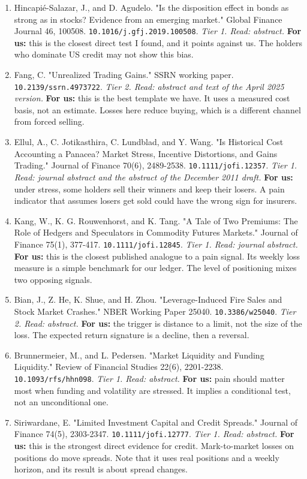 \begin{enumerate}[leftmargin=*,itemsep=3pt]
\item Hincapié-Salazar, J., and D. Agudelo. "Is the disposition effect in bonds as strong as in stocks? Evidence from an emerging market." Global Finance Journal 46, 100508. \nolinkurl{10.1016/j.gfj.2019.100508}. \emph{Tier 1. Read: abstract.} \textbf{For us:} this is the closest direct test I found, and it points against us. The holders who dominate US credit may not show this bias.
\item Fang, C. "Unrealized Trading Gains." SSRN working paper. \nolinkurl{10.2139/ssrn.4973722}. \emph{Tier 2. Read: abstract and text of the April 2025 version.} \textbf{For us:} this is the best template we have. It uses a measured cost basis, not an estimate. Losses here reduce buying, which is a different channel from forced selling.
\item Ellul, A., C. Jotikasthira, C. Lundblad, and Y. Wang. "Is Historical Cost Accounting a Panacea? Market Stress, Incentive Distortions, and Gains Trading." Journal of Finance 70(6), 2489-2538. \nolinkurl{10.1111/jofi.12357}. \emph{Tier 1. Read: journal abstract and the abstract of the December 2011 draft.} \textbf{For us:} under stress, some holders sell their winners and keep their losers. A pain indicator that assumes losers get sold could have the wrong sign for insurers.
\item Kang, W., K. G. Rouwenhorst, and K. Tang. "A Tale of Two Premiums: The Role of Hedgers and Speculators in Commodity Futures Markets." Journal of Finance 75(1), 377-417. \nolinkurl{10.1111/jofi.12845}. \emph{Tier 1. Read: journal abstract.} \textbf{For us:} this is the closest published analogue to a pain signal. Its weekly loss measure is a simple benchmark for our ledger. The level of positioning mixes two opposing signals.
\item Bian, J., Z. He, K. Shue, and H. Zhou. "Leverage-Induced Fire Sales and Stock Market Crashes." NBER Working Paper 25040. \nolinkurl{10.3386/w25040}. \emph{Tier 2. Read: abstract.} \textbf{For us:} the trigger is distance to a limit, not the size of the loss. The expected return signature is a decline, then a reversal.
\item Brunnermeier, M., and L. Pedersen. "Market Liquidity and Funding Liquidity." Review of Financial Studies 22(6), 2201-2238. \nolinkurl{10.1093/rfs/hhn098}. \emph{Tier 1. Read: abstract.} \textbf{For us:} pain should matter most when funding and volatility are stressed. It implies a conditional test, not an unconditional one.
\item Siriwardane, E. "Limited Investment Capital and Credit Spreads." Journal of Finance 74(5), 2303-2347. \nolinkurl{10.1111/jofi.12777}. \emph{Tier 1. Read: abstract.} \textbf{For us:} this is the strongest direct evidence for credit. Mark-to-market losses on positions do move spreads. Note that it uses real positions and a weekly horizon, and its result is about spread changes.

\end{enumerate}
